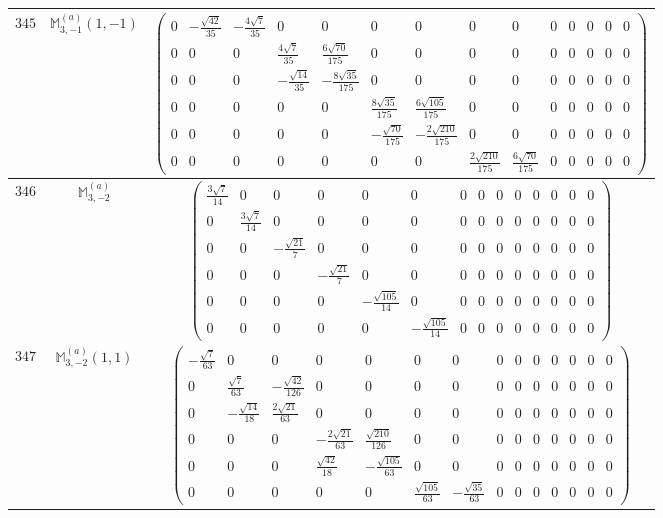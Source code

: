 \documentclass[fleqn,8pt,landscape]{jsarticle}
\begin{document}
\begin{center}
\begin{longtable}{ccc}
$ 345 $ & $ \mathbb{M}_{3,-1}^{(a)}(1,-1) $ & $ \begin{pmatrix} 0 & - \frac{\sqrt{42}}{35} & - \frac{4 \sqrt{7}}{35} & 0 & 0 & 0 & 0 & 0 & 0 & 0 & 0 & 0 & 0 & 0 \\ 0 & 0 & 0 & \frac{4 \sqrt{7}}{35} & \frac{6 \sqrt{70}}{175} & 0 & 0 & 0 & 0 & 0 & 0 & 0 & 0 & 0 \\ 0 & 0 & 0 & - \frac{\sqrt{14}}{35} & - \frac{8 \sqrt{35}}{175} & 0 & 0 & 0 & 0 & 0 & 0 & 0 & 0 & 0 \\ 0 & 0 & 0 & 0 & 0 & \frac{8 \sqrt{35}}{175} & \frac{6 \sqrt{105}}{175} & 0 & 0 & 0 & 0 & 0 & 0 & 0 \\ 0 & 0 & 0 & 0 & 0 & - \frac{\sqrt{70}}{175} & - \frac{2 \sqrt{210}}{175} & 0 & 0 & 0 & 0 & 0 & 0 & 0 \\ 0 & 0 & 0 & 0 & 0 & 0 & 0 & \frac{2 \sqrt{210}}{175} & \frac{6 \sqrt{70}}{175} & 0 & 0 & 0 & 0 & 0 \end{pmatrix} $ \\ \hline
$ 346 $ & $ \mathbb{M}_{3,-2}^{(a)} $ & $ \begin{pmatrix} \frac{3 \sqrt{7}}{14} & 0 & 0 & 0 & 0 & 0 & 0 & 0 & 0 & 0 & 0 & 0 & 0 & 0 \\ 0 & \frac{3 \sqrt{7}}{14} & 0 & 0 & 0 & 0 & 0 & 0 & 0 & 0 & 0 & 0 & 0 & 0 \\ 0 & 0 & - \frac{\sqrt{21}}{7} & 0 & 0 & 0 & 0 & 0 & 0 & 0 & 0 & 0 & 0 & 0 \\ 0 & 0 & 0 & - \frac{\sqrt{21}}{7} & 0 & 0 & 0 & 0 & 0 & 0 & 0 & 0 & 0 & 0 \\ 0 & 0 & 0 & 0 & - \frac{\sqrt{105}}{14} & 0 & 0 & 0 & 0 & 0 & 0 & 0 & 0 & 0 \\ 0 & 0 & 0 & 0 & 0 & - \frac{\sqrt{105}}{14} & 0 & 0 & 0 & 0 & 0 & 0 & 0 & 0 \end{pmatrix} $ \\ \hline
$ 347 $ & $ \mathbb{M}_{3,-2}^{(a)}(1,1) $ & $ \begin{pmatrix} - \frac{\sqrt{7}}{63} & 0 & 0 & 0 & 0 & 0 & 0 & 0 & 0 & 0 & 0 & 0 & 0 & 0 \\ 0 & \frac{\sqrt{7}}{63} & - \frac{\sqrt{42}}{126} & 0 & 0 & 0 & 0 & 0 & 0 & 0 & 0 & 0 & 0 & 0 \\ 0 & - \frac{\sqrt{14}}{18} & \frac{2 \sqrt{21}}{63} & 0 & 0 & 0 & 0 & 0 & 0 & 0 & 0 & 0 & 0 & 0 \\ 0 & 0 & 0 & - \frac{2 \sqrt{21}}{63} & \frac{\sqrt{210}}{126} & 0 & 0 & 0 & 0 & 0 & 0 & 0 & 0 & 0 \\ 0 & 0 & 0 & \frac{\sqrt{42}}{18} & - \frac{\sqrt{105}}{63} & 0 & 0 & 0 & 0 & 0 & 0 & 0 & 0 & 0 \\ 0 & 0 & 0 & 0 & 0 & \frac{\sqrt{105}}{63} & - \frac{\sqrt{35}}{63} & 0 & 0 & 0 & 0 & 0 & 0 & 0 \end{pmatrix} $ \\ \hline

\end{longtable}
\end{center}
\end{document}

